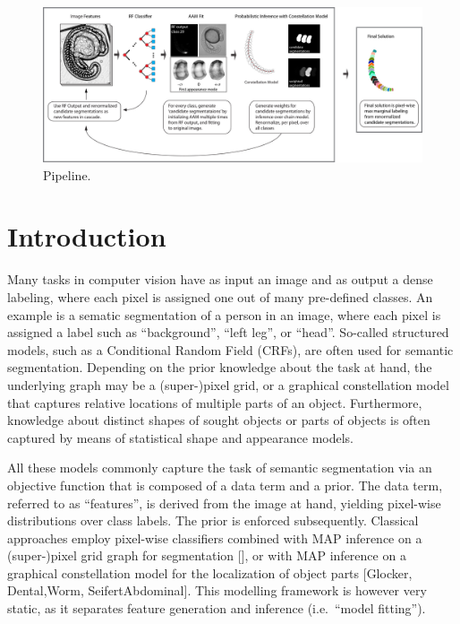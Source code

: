 \documentclass[10pt,twocolumn,letterpaper]{article}
\begin{document}
\begin{figure}[t]
\begin{center}
\includegraphics[width=\textwidth]{pipelineBIG.jpg} %
\caption{Pipeline.}
\label{fig:pipeline}
\end{center}
\end{figure}


\section{Introduction}
Many tasks in computer vision have as input an image and as output a dense labeling, where each pixel is assigned one out of many pre-defined classes. An example is a sematic segmentation of a person in an image, where each pixel is assigned a label such as “background”, “left leg”, or “head”. 
%
So-called structured models, such as a Conditional Random Field (CRFs), are often used for semantic segmentation. 
Depending on the prior knowledge about the task at hand, the underlying graph may be a (super-)pixel grid, or a graphical constellation model that captures relative locations of multiple parts of an object. 
%
Furthermore, knowledge about distinct shapes of sought objects or parts of objects is often captured by means of statistical shape and appearance models. 

All these models commonly capture the task of semantic segmentation via an objective function that is composed of a data term and a prior. 
%
The data term, referred to as "`features"', is derived from the image at hand, yielding pixel-wise distributions over class labels. The prior is enforced subsequently. 
%
%
Classical approaches employ pixel-wise classifiers combined with MAP inference on a (super-)pixel grid graph for segmentation [], or with MAP inference on a graphical constellation model for the localization of object parts [Glocker, Dental,Worm, SeifertAbdominal].  
%
This modelling framework is however very static, as it separates feature generation and inference (i.e.\ "`model fitting"'). 
\end{document}
